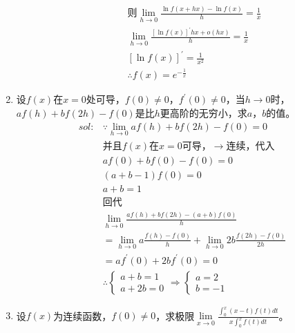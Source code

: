 \begin{enumerate}[{例}1.]
\begin{enumerate}[$1^\circ$]
\begin{align*}
                    &\mbox{则}\lim_{h \to 0}\frac{\ln f(x+hx)-\ln f(x)}{h}=\frac{1}{x}\\
                    &\lim_{h \to 0}\frac{[\ln f(x)]^{\prime}hx+o(hx)}{h}=\frac{1}{x}\\
                    &[\ln f(x)]^{\prime}=\frac{1}{x^2}\\
                    &\therefore f(x)=e^{-\frac{1}{x}}
                \end{align*}
        \end{enumerate}
    \item 设$f(x)$在$x=0$处可导，$f(0)\neq0$，$f^\prime(0)\neq0$，当$h\to0$时，$af(h)+bf(2h)-f(0)$是比$h$更高阶的无穷小，求$a$，$b$的值。
        \begin{align*}
            sol:&\because \lim_{h \to 0} af(h)+bf(2h)-f(0)=0\\
            &\mbox{并且}f(x)\mbox{在}x=0\mbox{可导，}\rightarrow\mbox{连续，代入}\\
            &af(0)+bf(0)-f(0)=0\\
            &(a+b-1)f(0)=0\\
            &a+b=1\\
            &\mbox{回代}\\
            &\lim_{h \to 0}\frac{af(h)+bf(2h)-(a+b)f(0)}{h}\\
            &=\lim_{h \to 0}a\frac{f(h)-f(0)}{h}+\lim_{h \to 0}2b\frac{f(2h)-f(0)}{2h}\\
            &=af^{\prime}(0)+2bf^{\prime}(0)=0\\
            &\therefore
            \begin{cases}
                a+b=1\\
                a+2b=0
            \end{cases}
            \Rightarrow
            \begin{cases}
                a=2\\
                b=-1
            \end{cases}
        \end{align*}
    \item 设$f(x)$为连续函数，$f(0)\neq0$，求极限$\lim\limits_{x\to0}\frac{\int_0^x (x-t)f(t)dt}{x\int_0^xf(t)dt}$。


\end{enumerate}
